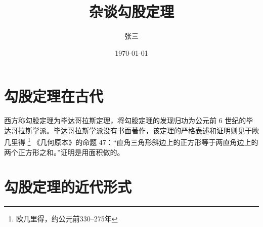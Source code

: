 \documentclass[UTF8]{ctexart}
\title{杂谈勾股定理}
\author{张三}
\date{\today}
\begin{document}
\maketitle
\tableofcontents
\section{勾股定理在古代}
西方称勾股定理为毕达哥拉斯定理，将勾股定理的发现归功为公元前 6 世纪的毕达哥拉斯学派。毕达哥拉斯学派没有书面著作，该定理的严格表述和证明则见于欧几里得
\footnote{欧几里得，约公元前330--275年}
《几何原本》的命题
 47：“直角三角形斜边上的正方形等于两直角边上的两个正方形之和。”证明是用面积做的。
\section{勾股定理的近代形式}

\end{document}
